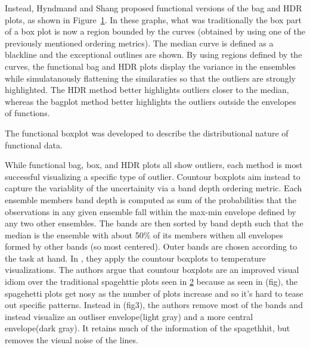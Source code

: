 \begin{figure}
\label{fig:funcbag}
\end{figure}
Instead, Hyndmand and Shang proposed functional versions of the bag and HDR
plots\cite{hyndman2009}, as shown in Figure~\ref{fig:funcbag}. In these graphs,
what was traditionally the box part of a box plot is now a region bounded by
the curves (obtained by using one of the previously mentioned ordering
metrics). The median curve is defined as a blackline and the exceptional
outlines are shown. By using regions defined by the curves, the functional bag
and HDR plots display the variance in the ensembles while simulatanously
flattening the similaraties so that the outliers are strongly highlighted. The
HDR method better highlights outliers closer to the median, whereas the bagplot
method better highlights the outliers outside the envelopes of functions. 



The functional boxplot was developed to describe the distributional nature of functional data\cite{sun2011}. 


\begin{figure}
\label{fig:countour}
\end{figure}
While functional bag, box, and HDR plots all show outliers, each method is most
successful visualizing a specific type of outlier. Countour
boxplots\cite{whitaker2013} aim instead to capture the variablity of the uncertainity via a band depth ordering metric. Each ensemble members band depth is computed as sum of the probabilities that the observations in any given ensemble fall within the max-min envelope defined by any two other ensembles. The bands are then sorted by band depth such that the median is the ensemble with about 50\% of its members withen all envelopes formed by other bands (so most centered). Outer bands are chosen according to the task at hand. In \cite{whitaker2013}, they apply the countour boxplots to temperature visualizations. %
The authors argue that countour boxplots are an improved visual idiom over the traditional spagehttie plots seen in \ref{fig:countour} because as seen in (fig), the spagehetti plots get nosy as the number of plots increase and so it's hard to tease out specific patterns. Instead in (fig3), the authors remove most of the bands and instead visualize an outliser envelope(light gray) and a more central envelope(dark gray). It retains much of the information of the spagethhit, but removes the visual noise of the lines.  
